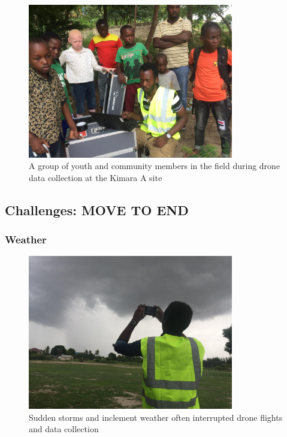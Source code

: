 \documentclass[a4paper,12pt,twoside]{article}
\begin{document}
        \begin{figure} %
            \centering
            \includegraphics[width=0.8\textwidth]{images/image11.jpg}
            \caption{A group of youth and community members in the field during drone data collection at the Kimara A site}
        \end{figure}
        
\subsection{Challenges: MOVE TO END}
    \subsubsection{Weather}
    
        \begin{figure} %
            \centering
            \includegraphics[width=0.8\textwidth]{images/image9.jpg}
            \caption{Sudden storms and inclement weather often interrupted drone flights and data collection}
        \end{figure}
        
\end{document}
